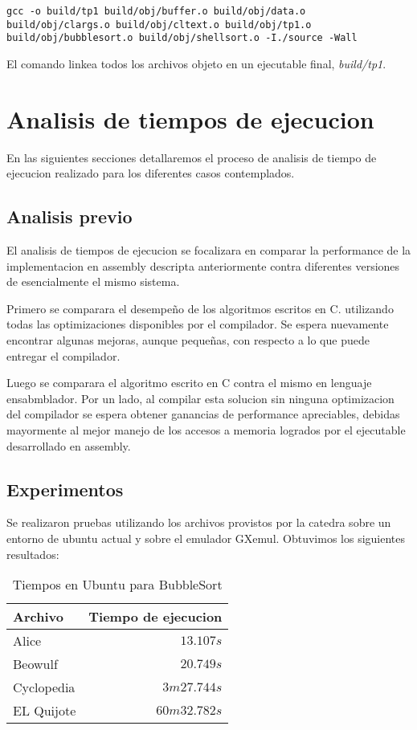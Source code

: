 \documentclass[a4paper,11pt]{article}
\begin{document}
\begin{lstlisting}
gcc -o build/tp1 build/obj/buffer.o build/obj/data.o build/obj/clargs.o build/obj/cltext.o build/obj/tp1.o build/obj/bubblesort.o build/obj/shellsort.o -I./source -Wall 
\end{lstlisting}

El comando linkea todos los archivos objeto en un ejecutable final,
\textit{build/tp1}.

\section{Analisis de tiempos de ejecucion}

En las siguientes secciones detallaremos el proceso de analisis de tiempo de
ejecucion realizado para los diferentes casos contemplados.

\subsection{Analisis previo}\label{sec:tiempos}

El analisis de tiempos de ejecucion se focalizara en comparar la performance de
la implementacion en assembly descripta anteriormente contra diferentes
versiones de esencialmente el mismo sistema.

Primero se comparara el desempeño de los algoritmos escritos en C. utilizando todas las optimizaciones disponibles por el
compilador. Se espera nuevamente encontrar algunas mejoras, aunque pequeñas,
con respecto a lo que puede entregar el compilador.

Luego se comparara el algoritmo escrito en C contra el mismo en lenguaje ensabmblador.
Por un lado, al compilar esta solucion sin ninguna optimizacion del compilador 
se espera obtener ganancias de performance apreciables, debidas mayormente al 
mejor manejo de los accesos a memoria logrados por el ejecutable desarrollado en assembly.

\subsection{Experimentos}

Se realizaron pruebas utilizando los archivos provistos por la catedra sobre un entorno de ubuntu actual y sobre el emulador GXemul.
Obtuvimos los siguientes resultados:

\begin{table}[h!t]
\centering
\begin{tabular}{ | l | r | }
  \hline
  Archivo          & Tiempo de ejecucion \\ \hline
  Alice				 & \(13.107s\) \\
  Beowulf     & \(20.749s\) \\
  Cyclopedia     & \(3m 27.744s\) \\
  EL Quijote      & \(60m 32.782s\) \\
  \hline
\end{tabular}
\caption{Tiempos en Ubuntu para BubbleSort}
\label{tab:resultados}
\end{table}
\end{document}
